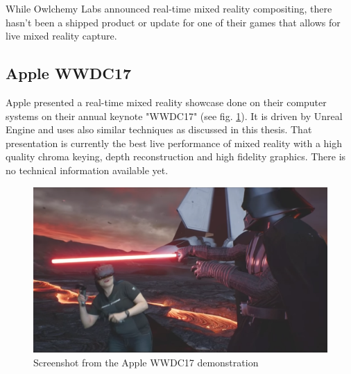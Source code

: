 While Owlchemy Labs announced real-time mixed reality compositing, there hasn't 
been a shipped product or update for one of their games that allows for live 
mixed reality capture\cite{owlchemy:mr:3:2017}.

\subsection{Apple WWDC17}

Apple presented a real-time mixed reality showcase done on their computer 
systems on their annual keynote "WWDC17" (see fig. 
\ref{fig:mrproduction:apple}). It is driven by Unreal Engine and 
uses also similar techniques as discussed in this thesis. That presentation is 
currently the best live performance of mixed reality with a high quality chroma 
keying, depth reconstruction and high fidelity graphics. There is no technical 
information available yet\cite{ilmxlab:mr-demo:2017}.

\begin{figure}[htb]
	\centering
	\includegraphics[width=\textwidth]{_external/media/apple-mr.png}
	\caption{Screenshot from the Apple WWDC17 
	demonstration\cite{ilmxlab:mr-demo:2017}}
	\label{fig:mrproduction:apple}
\end{figure}
